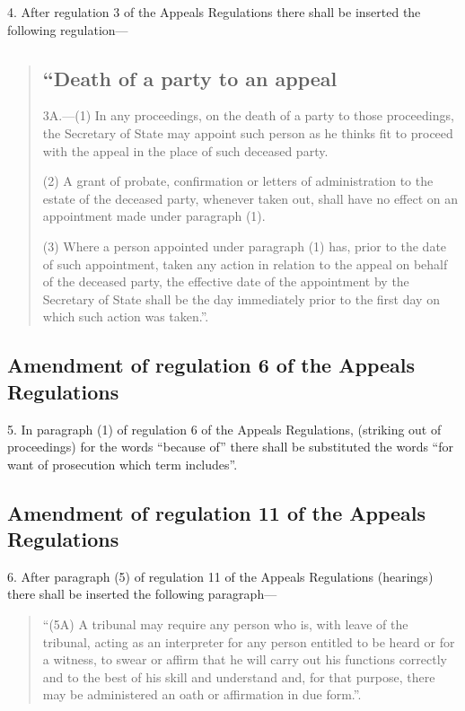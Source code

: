 \documentclass[a4paper]{article}
\begin{document}
4.  After regulation 3 of the Appeals Regulations there shall be inserted the following regulation—
\begin{quotation}
\subsection*{“Death of a party to an appeal}

3A.—(1) In any proceedings, on the death of a party to those proceedings, the Secretary of State may appoint such person as he thinks fit to proceed with the appeal in the place of such deceased party.

(2) A grant of probate, confirmation or letters of administration to the estate of the deceased party, whenever taken out, shall have no effect on an appointment made under paragraph (1).

(3) Where a person appointed under paragraph (1) has, prior to the date of such appointment, taken any action in relation to the appeal on behalf of the deceased party, the effective date of the appointment by the Secretary of State shall be the day immediately prior to the first day on which such action was taken.”.
\end{quotation}

\subsection[5. Amendment of regulation 6 of the Appeals Regulations]{Amendment of regulation 6 of the Appeals Regulations}

5.  In paragraph (1) of regulation 6 of the Appeals Regulations, (striking out of proceedings) for the words “because of” there shall be substituted the words “for want of prosecution which term includes”.

\subsection[6. Amendment of regulation 11 of the Appeals Regulations]{Amendment of regulation 11 of the Appeals Regulations}

6.  After paragraph (5) of regulation 11 of the Appeals Regulations (hearings) there shall be inserted the following paragraph—
\begin{quotation}
“(5A) A tribunal may require any person who is, with leave of the tribunal, acting as an interpreter for any person entitled to be heard or for a witness, to swear or affirm that he will carry out his functions correctly and to the best of his skill and understand and, for that purpose, there may be administered an oath or affirmation in due form.”.
\end{quotation}
\end{document}
